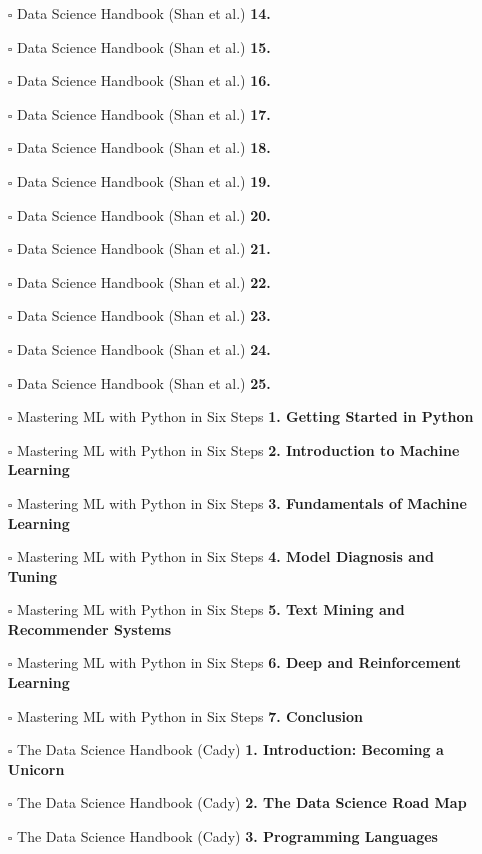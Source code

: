 \documentclass[a4, landscape, 12pt]{article}
\newcommand{\checkbox}{$\square$}%
\begin{document}
\begin{itemize}
{}
\item [\checkbox]  Data Science Handbook (Shan et al.) \textbf{ 14.
}
\item [\checkbox]  Data Science Handbook (Shan et al.) \textbf{ 15.
}
\item [\checkbox]  Data Science Handbook (Shan et al.) \textbf{ 16.
}
\item [\checkbox]  Data Science Handbook (Shan et al.) \textbf{ 17.
}
\item [\checkbox]  Data Science Handbook (Shan et al.) \textbf{ 18.
}
\item [\checkbox]  Data Science Handbook (Shan et al.) \textbf{ 19.
}
\item [\checkbox]  Data Science Handbook (Shan et al.) \textbf{ 20.
}
\item [\checkbox]  Data Science Handbook (Shan et al.) \textbf{ 21.
}
\item [\checkbox]  Data Science Handbook (Shan et al.) \textbf{ 22.
}
\item [\checkbox]  Data Science Handbook (Shan et al.) \textbf{ 23.
}
\item [\checkbox]  Data Science Handbook (Shan et al.) \textbf{ 24.
}
\item [\checkbox]  Data Science Handbook (Shan et al.) \textbf{ 25.
}
\item [\checkbox]  Mastering ML with Python in Six Steps \textbf{ 1. Getting Started in Python
}
\item [\checkbox]  Mastering ML with Python in Six Steps \textbf{ 2. Introduction to Machine Learning
}
\item [\checkbox]  Mastering ML with Python in Six Steps \textbf{ 3. Fundamentals of Machine Learning
}
\item [\checkbox]  Mastering ML with Python in Six Steps \textbf{ 4. Model Diagnosis and Tuning
}
\item [\checkbox]  Mastering ML with Python in Six Steps \textbf{ 5. Text Mining and Recommender Systems
}
\item [\checkbox]  Mastering ML with Python in Six Steps \textbf{ 6. Deep and Reinforcement Learning
}
\item [\checkbox]  Mastering ML with Python in Six Steps \textbf{ 7. Conclusion
}
\item [\checkbox]  The Data Science Handbook (Cady) \textbf{ 1. Introduction: Becoming a Unicorn
}
\item [\checkbox]  The Data Science Handbook (Cady) \textbf{ 2. The Data Science Road Map
}
\item [\checkbox]  The Data Science Handbook (Cady) \textbf{ 3. Programming Languages
}
\end{itemize}
\end{document}
